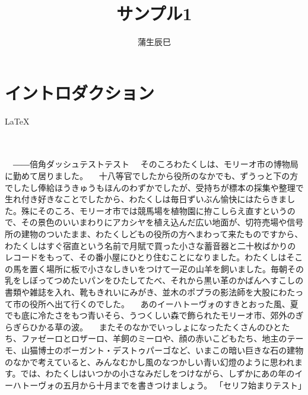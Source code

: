 

\title{サンプル1}
\author{蒲生辰巳}




\section{イントロダクション}
\LaTeX\\
\\
\\

　――倍角ダッシュ\tcy{!!}\zenaki{}テスト\zenaki{}テスト\zenaki{}
\parbr
　そのころわたくしは、モリーオ市の博物局に勤めて居りました。
\parbr
　十八等官でしたから役所のなかでも、ずうっと下の方でしたし俸給ほうきゅうもほんのわずかでしたが、受持ちが標本の採集や整理で生れ付き好きなことでしたから、わたくしは毎日ずいぶん愉快にはたらきました。殊にそのころ、モリーオ市では競馬場を植物園に拵こしらえ直すというので、その景色のいいまわりにアカシヤを植え込んだ広い地面が、切符売場や信号所の建物のついたまま、わたくしどもの役所の方へまわって来たものですから、わたくしはすぐ宿直という名前で月賦で買った小さな蓄音器と二十枚ばかりのレコードをもって、その番小屋にひとり住むことになりました。わたくしはそこの馬を置く場所に板で小さなしきいをつけて一疋の山羊を飼いました。毎朝その乳をしぼってつめたいパンをひたしてたべ、それから黒い革のかばんへすこしの書類や雑誌を入れ、靴もきれいにみがき、並木のポプラの影法師を大股にわたって市の役所へ出て行くのでした。
\parbr
　あのイーハトーヴォのすきとおった風、夏でも底に冷たさをもつ青いそら、うつくしい森で飾られたモリーオ市、郊外のぎらぎらひかる草の波。
\parbr
　またそのなかでいっしょになったたくさんのひとたち、ファゼーロとロザーロ、羊飼のミーロや、顔の赤いこどもたち、地主のテーモ、山猫博士のボーガント・デストゥパーゴなど、いまこの暗い巨きな石の建物のなかで考えていると、みんなむかし風のなつかしい青い幻燈のように思われます。では、わたくしはいつかの小さなみだしをつけながら、しずかにあの年のイーハトーヴォの五月から十月までを書きつけましょう。
\parbr
「セリフ始まりテスト」

